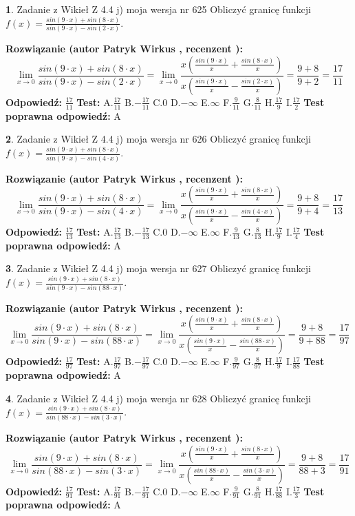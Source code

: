 \documentclass[12pt, a4paper]{article}
\theoremstyle{definition} %
\newtheorem{zad}{}
\newcommand{\zadStart}[1]{\begin{zad}#1\newline}
\newcommand{\zadStop}{\end{zad}}
\newcommand{\rozwStart}[2]{\noindent \textbf{Rozwiązanie (autor #1 , recenzent #2): }\newline}
\newcommand{\rozwStop}{\newline}
\newcommand{\odpStart}{\noindent \textbf{Odpowiedź:}\newline}
\newcommand{\odpStop}{\newline}
\newcommand{\testStart}{\noindent \textbf{Test:}\newline}
\newcommand{\testStop}{\newline}
\newcommand{\kluczStart}{\noindent \textbf{Test poprawna odpowiedź:}\newline}
\newcommand{\kluczStop}{\newline}
\begin{document}
\zadStart{Zadanie z Wikieł Z 4.4 j) moja wersja nr 625}
Obliczyć granicę funkcji $f(x)=\frac{sin(9\cdot x) +sin(8\cdot x)}{sin(9\cdot x) -sin(2\cdot x)}$.
\zadStop
\rozwStart{Patryk Wirkus}{}
$$\lim\limits_{x\to 0}\frac{sin(9\cdot x) +sin(8\cdot x)}{sin(9\cdot x) -sin(2\cdot x)}=\lim\limits_{x\to 0}\frac{x(\frac{sin(9\cdot x)}{x}+\frac{sin(8\cdot x)}{x})}{x(\frac{sin(9\cdot x)}{x}-\frac{sin(2\cdot x)}{x})}=\frac{9+8}{9+2} = \frac{17}{11}$$
\rozwStop
\odpStart
$\frac{17}{11}$
\odpStop
\testStart
A.$\frac{17}{11}$
B.$-\frac{17}{11}$
C.$0$
D.$-\infty$
E.$\infty$
F.$\frac{9}{11}$
G.$\frac{8}{11}$
H.$\frac{17}{9}$
I.$\frac{17}{2}$
\testStop
\kluczStart
A
\kluczStop



\zadStart{Zadanie z Wikieł Z 4.4 j) moja wersja nr 626}
Obliczyć granicę funkcji $f(x)=\frac{sin(9\cdot x) +sin(8\cdot x)}{sin(9\cdot x) -sin(4\cdot x)}$.
\zadStop
\rozwStart{Patryk Wirkus}{}
$$\lim\limits_{x\to 0}\frac{sin(9\cdot x) +sin(8\cdot x)}{sin(9\cdot x) -sin(4\cdot x)}=\lim\limits_{x\to 0}\frac{x(\frac{sin(9\cdot x)}{x}+\frac{sin(8\cdot x)}{x})}{x(\frac{sin(9\cdot x)}{x}-\frac{sin(4\cdot x)}{x})}=\frac{9+8}{9+4} = \frac{17}{13}$$
\rozwStop
\odpStart
$\frac{17}{13}$
\odpStop
\testStart
A.$\frac{17}{13}$
B.$-\frac{17}{13}$
C.$0$
D.$-\infty$
E.$\infty$
F.$\frac{9}{13}$
G.$\frac{8}{13}$
H.$\frac{17}{9}$
I.$\frac{17}{4}$
\testStop
\kluczStart
A
\kluczStop



\zadStart{Zadanie z Wikieł Z 4.4 j) moja wersja nr 627}
Obliczyć granicę funkcji $f(x)=\frac{sin(9\cdot x) +sin(8\cdot x)}{sin(9\cdot x) -sin(88\cdot x)}$.
\zadStop
\rozwStart{Patryk Wirkus}{}
$$\lim\limits_{x\to 0}\frac{sin(9\cdot x) +sin(8\cdot x)}{sin(9\cdot x) -sin(88\cdot x)}=\lim\limits_{x\to 0}\frac{x(\frac{sin(9\cdot x)}{x}+\frac{sin(8\cdot x)}{x})}{x(\frac{sin(9\cdot x)}{x}-\frac{sin(88\cdot x)}{x})}=\frac{9+8}{9+88} = \frac{17}{97}$$
\rozwStop
\odpStart
$\frac{17}{97}$
\odpStop
\testStart
A.$\frac{17}{97}$
B.$-\frac{17}{97}$
C.$0$
D.$-\infty$
E.$\infty$
F.$\frac{9}{97}$
G.$\frac{8}{97}$
H.$\frac{17}{9}$
I.$\frac{17}{88}$
\testStop
\kluczStart
A
\kluczStop



\zadStart{Zadanie z Wikieł Z 4.4 j) moja wersja nr 628}
Obliczyć granicę funkcji $f(x)=\frac{sin(9\cdot x) +sin(8\cdot x)}{sin(88\cdot x) -sin(3\cdot x)}$.
\zadStop
\rozwStart{Patryk Wirkus}{}
$$\lim\limits_{x\to 0}\frac{sin(9\cdot x) +sin(8\cdot x)}{sin(88\cdot x) -sin(3\cdot x)}=\lim\limits_{x\to 0}\frac{x(\frac{sin(9\cdot x)}{x}+\frac{sin(8\cdot x)}{x})}{x(\frac{sin(88\cdot x)}{x}-\frac{sin(3\cdot x)}{x})}=\frac{9+8}{88+3} = \frac{17}{91}$$
\rozwStop
\odpStart
$\frac{17}{91}$
\odpStop
\testStart
A.$\frac{17}{91}$
B.$-\frac{17}{91}$
C.$0$
D.$-\infty$
E.$\infty$
F.$\frac{9}{91}$
G.$\frac{8}{91}$
H.$\frac{17}{88}$
I.$\frac{17}{3}$
\testStop
\kluczStart
A
\kluczStop
\end{document}

